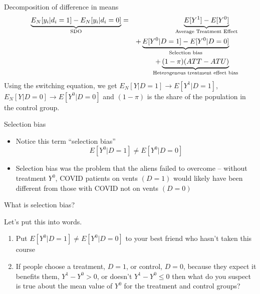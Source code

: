 \documentclass{beamer}
\begin{document}
\begin{frame}[plain]

  \begin{block}{Decomposition of difference in means}
    \begin{eqnarray*}
      \underbrace{E_N[y_i | d_i=1] - E_N[y_i | d_i=0]}_{ \mathclap{\text{SDO}}}&=& \underbrace{E[Y^1] - E[Y^0]}_{ \mathclap{\text{Average Treatment Effect}}} \\
      &&+ \underbrace{E[Y^0|D=1] - E[Y^0 | D=0]}_{ \mathclap{\text{Selection bias}}}  \\
      && + \underbrace{(1-\pi)(ATT - ATU)}_{ \mathclap{\text{Heterogenous treatment effect bias}}}
    \end{eqnarray*}
    Using the switching equation, we get $E_N[Y|D=1] \to E[Y^1 | D=1]$, $E_N[Y|D=0] \to E[Y^0|D=0]$ and $(1-\pi)$ is the share of the population in the control group.
  \end{block}

\end{frame}

\begin{frame}{Selection bias}

  \begin{itemize}
    \item Notice this term ``selection bias'' $$E[Y^0|D=1] \neq E[Y^0 |D=0]$$
    \item Selection bias was the problem that the aliens failed to overcome -- without treatment $Y^0$, COVID patients on vents $(D=1)$ would likely have been different from those with COVID not on vents $(D=0)$
  \end{itemize}

\end{frame}


\begin{frame}{What is selection bias?}

  Let's put this into words.
  \bigskip
  \begin{enumerate}
    \item Put $E[Y^0|D=1] \neq E[Y^0|D=0]$ to your best friend who hasn't taken this course
    \item If people choose a treatment, $D=1$, or control, $D=0$, because they expect it benefits them, $Y^1-Y^0>0$, or doesn't $Y^1-Y^0\leq0$ then what do you suspect is true about the mean value of $Y^0$ for the treatment and control groups?
  \end{enumerate}

\end{frame}
\end{document}
